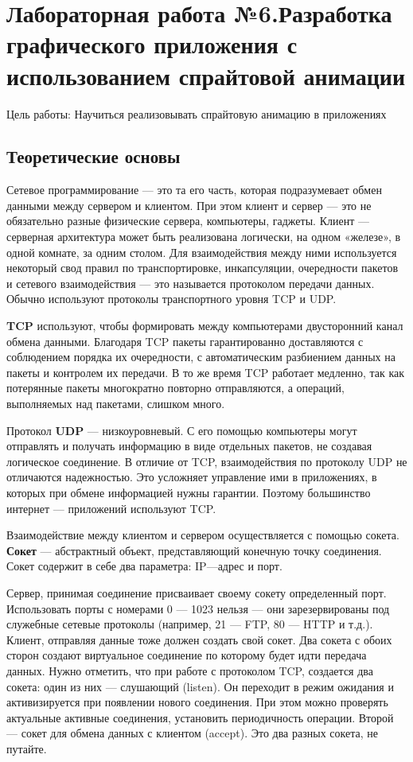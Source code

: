 \documentclass[a4paper]{article}
\begin{document}
\newpage
\section{Лабораторная работа №6.\newline Разработка графического приложения с использованием спрайтовой анимации}

Цель работы: Научиться реализовывать спрайтовую анимацию в приложениях

\subsection{Теоретические основы}

Сетевое программирование --- это та его часть, которая подразумевает обмен данными между сервером и клиентом. При этом клиент и сервер --- это не обязательно разные физические сервера, компьютеры, гаджеты. Клиент --- серверная архитектура может быть реализована логически, на одном «железе», в одной комнате, за одним столом. Для взаимодействия между ними используется некоторый свод правил по транспортировке, инкапсуляции, очередности пакетов и сетевого взаимодействия --- это называется протоколом передачи данных. Обычно используют протоколы транспортного уровня TCP и UDP.

\textbf{TCP} используют, чтобы формировать между компьютерами двусторонний канал обмена данными. Благодаря TCP пакеты гарантированно доставляются с соблюдением порядка их очередности, с автоматическим разбиением данных на пакеты и контролем их передачи. В то же время TCP работает медленно, так как потерянные пакеты многократно повторно отправляются, а операций, выполняемых над пакетами, слишком много.

Протокол \textbf{UDP} --- низкоуровневый. С его помощью компьютеры могут отправлять и получать информацию в виде отдельных пакетов, не создавая логическое соединение. В отличие от TCP, взаимодействия по протоколу UDP не отличаются надежностью. Это усложняет управление ими в приложениях, в которых при обмене информацией нужны гарантии. Поэтому большинство интернет --- приложений используют TCP.

Взаимодействие между клиентом и сервером осуществляется с помощью сокета. \textbf{Сокет} --- абстрактный объект, представляющий конечную точку соединения. Сокет содержит в себе два параметра: IP---адрес и порт.

Сервер, принимая соединение присваивает своему сокету определенный порт. Использовать порты с номерами 0 --- 1023 нельзя --- они зарезервированы под служебные сетевые протоколы (например, 21 --- FTP, 80 --- HTTP и т.д.). Клиент, отправляя данные тоже должен создать свой сокет. Два сокета с обоих сторон создают виртуальное соединение по которому будет идти передача данных. Нужно отметить, что при работе с протоколом TCP, создается два сокета: один из них — слушающий (listen). Он переходит в режим ожидания и активизируется при появлении нового соединения. При этом можно проверять актуальные активные соединения, установить периодичность операции. Второй — сокет для обмена данных с клиентом (accept). Это два разных сокета, не путайте.
\end{document}
